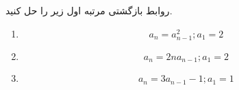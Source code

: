 \EXERCISE
روابط بازگشتی مرتبه اول زیر را حل کنید.
\begin{enumerate}
\item
$$a_n = a_{n-1}^2; a_1 = 2$$
\item
$$a_n = 2na_{n-1}; a_1 = 2$$
\item
$$a_n = 3a_{n-1} - 1; a_1 = 1$$
\end{enumerate}